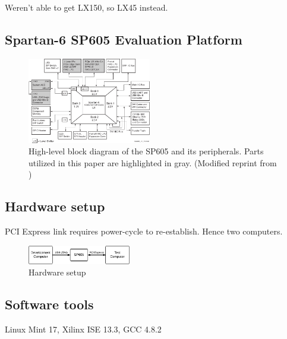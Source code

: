 Weren't able to get LX150, so LX45 instead.

\subsection{Spartan-6 SP605 Evaluation Platform}

\TODO

\begin{figure}[!ht]
    \centering
    \includegraphics[width=0.48\textwidth]{figures/sp605-modified}
    \caption{High-level block diagram of the SP605 and its peripherals. Parts utilized in this paper are highlighted in gray. (Modified reprint from \cite{ug526})}
    \label{fig:sp605}
\end{figure}

\subsection{Hardware setup}

PCI Express link requires power-cycle to re-establish. Hence two computers.

\begin{figure}[!ht]
    \centering
    \includegraphics[width=0.40\textwidth]{figures/hardware-setup}
    \caption{Hardware setup}
    \label{fig:hardware-setup}
\end{figure}

\subsection{Software tools}

Linux Mint 17, Xilinx ISE 13.3, GCC 4.8.2

